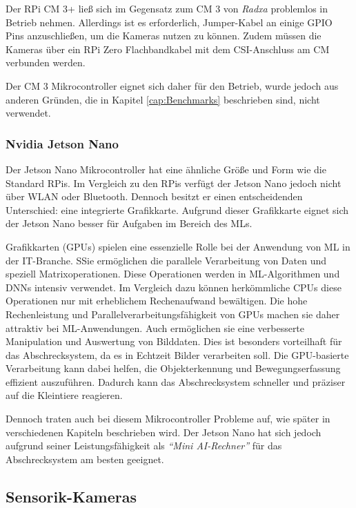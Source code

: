 Der \ac{RPi} \ac{CM} 3+ ließ sich im Gegensatz zum \ac{CM} 3 von \textit{Radxa} problemlos in Betrieb nehmen. Allerdings ist es erforderlich, Jumper-Kabel an einige \ac{GPIO} Pins anzuschließen, um die Kameras nutzen zu können. Zudem müssen die Kameras über ein \ac{RPi} Zero Flachbandkabel mit dem \acs{CSI}-Anschluss am \ac{CM} verbunden werden. \cite{cm3}

Der \ac{CM} 3 Mikrocontroller eignet sich daher für den Betrieb, wurde jedoch aus anderen Gründen, die in Kapitel \ref{cap:Benchmarks} beschrieben sind, nicht verwendet.

\subsubsection{Nvidia Jetson Nano}

Der Jetson Nano Mikrocontroller hat eine ähnliche Größe und Form wie die Standard \ac{RPi}s. Im Vergleich zu den \ac{RPi}s verfügt der Jetson Nano jedoch nicht über WLAN oder Bluetooth. Dennoch besitzt er einen entscheidenden Unterschied: eine integrierte Grafikkarte. Aufgrund dieser Grafikkarte eignet sich der Jetson Nano besser für Aufgaben im Bereich des \acl{ML}s. \cite{nvidia_jn}

Grafikkarten (\acs{GPU}s) spielen eine essenzielle Rolle bei der Anwendung von \ac{ML} in der IT-Branche. SSie ermöglichen die parallele Verarbeitung von Daten und speziell Matrixoperationen. Diese Operationen werden in \ac{ML}-Algorithmen und \ac{DNN}s intensiv verwendet. Im Vergleich dazu können herkömmliche CPUs diese Operationen nur mit erheblichem Rechenaufwand bewältigen. Die hohe Rechenleistung und Parallelverarbeitungsfähigkeit von GPUs machen sie daher attraktiv bei \ac{ML}-Anwendungen. Auch ermöglichen sie eine verbesserte Manipulation und Auswertung von Bilddaten. Dies ist besonders vorteilhaft für das Abschrecksystem, da es in Echtzeit Bilder verarbeiten soll.
Die \ac{GPU}-basierte Verarbeitung kann dabei helfen, die Objekterkennung und Bewegungserfassung effizient auszuführen. Dadurch kann das Abschrecksystem schneller und präziser auf die Kleintiere reagieren. \cite{gpus}

Dennoch traten auch bei diesem Mikrocontroller Probleme auf, wie später in verschiedenen Kapiteln beschrieben wird. Der Jetson Nano hat sich jedoch aufgrund seiner Leistungsfähigkeit als \textit{"`Mini AI-Rechner"'} für das Abschrecksystem am besten geeignet.

\subsection{Sensorik-Kameras}

